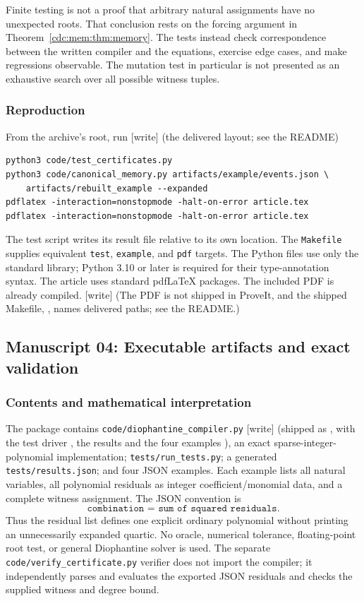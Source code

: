 \documentclass[11pt,a4paper]{article}
\theoremstyle{definition}
\theoremstyle{remark}
\newcommand{\wtag}{\textup{[write]}}%
\begin{document}
Finite testing is not a proof that arbitrary natural assignments have no
unexpected roots. That conclusion rests on the forcing argument in
Theorem~\ref{cdc:mem:thm:memory}. The tests instead check correspondence between the
written compiler and the equations, exercise edge cases, and make regressions
observable. The mutation test in particular is not presented as an exhaustive
search over all possible witness tuples.

\subsubsection{Reproduction}
From the archive's root, run \wtag{} (the delivered layout; see the README)
\begin{lstlisting}
python3 code/test_certificates.py
python3 code/canonical_memory.py artifacts/example/events.json \
    artifacts/rebuilt_example --expanded
pdflatex -interaction=nonstopmode -halt-on-error article.tex
pdflatex -interaction=nonstopmode -halt-on-error article.tex
\end{lstlisting}
The test script writes its result file relative to its own location. The
\texttt{Makefile} supplies equivalent \texttt{test}, \texttt{example}, and
\texttt{pdf} targets. The Python files use only the standard library; Python
3.10 or later is required for their type-annotation syntax. The article uses
standard pdf\LaTeX{} packages. The included PDF is already compiled. \wtag{} (The PDF is not shipped in ProveIt, and the shipped Makefile, , names delivered paths; see the README.)


\subsection{Manuscript 04: Executable artifacts and exact validation}
\subsubsection{Contents and mathematical interpretation}
The package contains \texttt{code/diophantine\_compiler.py} \wtag{} (shipped as , with the test driver , the results  and the four examples ), an exact sparse-integer-polynomial implementation; \texttt{tests/run\_tests.py}; a generated \texttt{tests/results.json}; and four JSON examples. Each example lists all natural variables, all polynomial residuals as integer coefficient/monomial data, and a complete witness assignment. The JSON convention is
\[
 \texttt{combination = sum of squared residuals}.
\]
Thus the residual list defines one explicit ordinary polynomial without printing an unnecessarily expanded quartic. No oracle, numerical tolerance, floating-point root test, or general Diophantine solver is used. The separate \texttt{code/verify\_certificate.py} verifier does not import the compiler; it independently parses and evaluates the exported JSON residuals and checks the supplied witness and degree bound.
\end{document}
